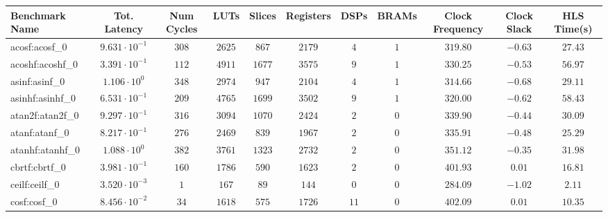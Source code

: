 \begin{tabular}{|l|c|c|c|c|c|c|c|c|c|c|}
\hline
Benchmark Name               & Tot. Latency            & Num Cycles & LUTs      & Slices    & Registers & DSPs    & BRAMs & Clock Frequency & Clock Slack & HLS Time(s) \\
\hline
acosf:acosf\_0               & $ 9.631 \cdot 10^{-1} $ & $ 308    $ & $ 2625  $ & $ 867   $ & $ 2179  $ & $ 4   $ & $ 1 $ & $ 319.80      $ & $ -0.63   $ & $ 27.43   $ \\
acoshf:acoshf\_0             & $ 3.391 \cdot 10^{-1} $ & $ 112    $ & $ 4911  $ & $ 1677  $ & $ 3575  $ & $ 9   $ & $ 1 $ & $ 330.25      $ & $ -0.53   $ & $ 56.97   $ \\
asinf:asinf\_0               & $ 1.106 \cdot 10^{0}  $ & $ 348    $ & $ 2974  $ & $ 947   $ & $ 2104  $ & $ 4   $ & $ 1 $ & $ 314.66      $ & $ -0.68   $ & $ 29.11   $ \\
asinhf:asinhf\_0             & $ 6.531 \cdot 10^{-1} $ & $ 209    $ & $ 4765  $ & $ 1699  $ & $ 3502  $ & $ 9   $ & $ 1 $ & $ 320.00      $ & $ -0.62   $ & $ 58.43   $ \\
atan2f:atan2f\_0             & $ 9.297 \cdot 10^{-1} $ & $ 316    $ & $ 3094  $ & $ 1070  $ & $ 2424  $ & $ 2   $ & $ 0 $ & $ 339.90      $ & $ -0.44   $ & $ 30.09   $ \\
atanf:atanf\_0               & $ 8.217 \cdot 10^{-1} $ & $ 276    $ & $ 2469  $ & $ 839   $ & $ 1967  $ & $ 2   $ & $ 0 $ & $ 335.91      $ & $ -0.48   $ & $ 25.29   $ \\
atanhf:atanhf\_0             & $ 1.088 \cdot 10^{0}  $ & $ 382    $ & $ 3761  $ & $ 1323  $ & $ 2732  $ & $ 2   $ & $ 0 $ & $ 351.12      $ & $ -0.35   $ & $ 31.98   $ \\
cbrtf:cbrtf\_0               & $ 3.981 \cdot 10^{-1} $ & $ 160    $ & $ 1786  $ & $ 590   $ & $ 1623  $ & $ 2   $ & $ 0 $ & $ 401.93      $ & $ 0.01    $ & $ 16.81   $ \\
ceilf:ceilf\_0               & $ 3.520 \cdot 10^{-3} $ & $ 1      $ & $ 167   $ & $ 89    $ & $ 144   $ & $ 0   $ & $ 0 $ & $ 284.09      $ & $ -1.02   $ & $ 2.11    $ \\
cosf:cosf\_0                 & $ 8.456 \cdot 10^{-2} $ & $ 34     $ & $ 1618  $ & $ 575   $ & $ 1726  $ & $ 11  $ & $ 0 $ & $ 402.09      $ & $ 0.01    $ & $ 10.35   $ \\

\end{tabular}
